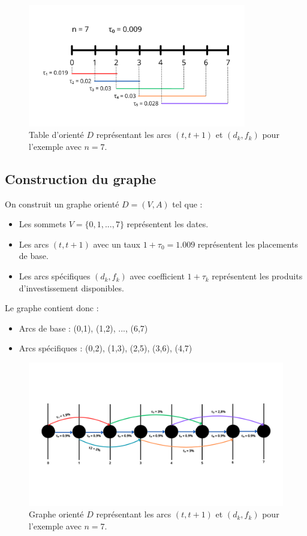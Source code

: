 \documentclass[a4paper,11pt]{article}
\begin{document}
\begin{figure}[h!]
	\centering
	\includegraphics[width=0.85\textwidth]{images/table.png}
	\caption{Table d'orienté $D$ représentant les arcs $(t, t+1)$ et $(d_k, f_k)$ pour l'exemple avec $n = 7$.}
	\label{fig:table_exemple}
\end{figure}

\subsection{Construction du graphe}

On construit un graphe orienté $D = (V, A)$ tel que :
\begin{itemize}
	\item Les sommets $V = \{0, 1, ..., 7\}$ représentent les dates.
	\item Les arcs $(t, t+1)$ avec un taux $1 + \tau_0 = 1.009$ représentent les placements de base.
	\item Les arcs spécifiques $(d_k, f_k)$ avec coefficient $1 + \tau_k$ représentent les produits d’investissement disponibles.
\end{itemize}

Le graphe contient donc :
\begin{itemize}
	\item Arcs de base : (0,1), (1,2), ..., (6,7)
	\item Arcs spécifiques : (0,2), (1,3), (2,5), (3,6), (4,7)
\end{itemize}

\begin{figure}[h!]
	\centering
	\includegraphics[width=1\textwidth]{images/graph_concret_exemple.png}
	\caption{Graphe orienté $D$ représentant les arcs $(t, t+1)$ et $(d_k, f_k)$ pour l'exemple avec $n = 7$.}
	\label{fig:graphe_exemple}
\end{figure}
\newpage
\end{document}
